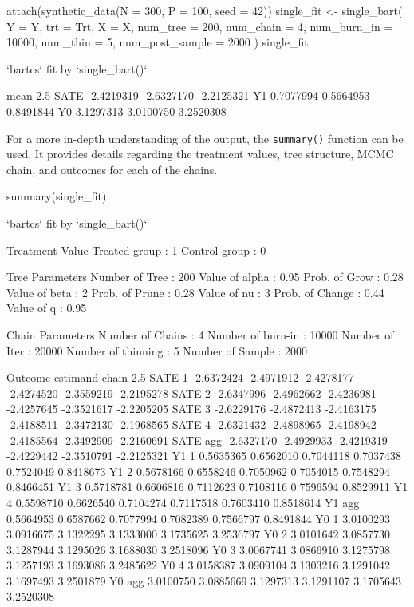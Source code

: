 \begin{example}
attach(synthetic_data(N = 300, P = 100, seed = 42))
single_fit <- single_bart(
    Y = Y, trt = Trt, X = X,
    num_tree = 200, num_chain = 4,
    num_burn_in = 10000, num_thin = 5, num_post_sample = 2000
  )
single_fit

`bartcs` fit by `single_bart()`

           mean       2.5%
SATE -2.4219319 -2.6327170 -2.2125321
Y1    0.7077994  0.5664953  0.8491844
Y0    3.1297313  3.0100750  3.2520308
\end{example}
For a more in-depth understanding of the output, the \verb|summary()| function can be used. It provides
details regarding the treatment values, tree structure, MCMC chain, and outcomes for each of the
chains.
\begin{example}
summary(single_fit)

`bartcs` fit by `single_bart()`

Treatment Value
  Treated group    :      1
  Control group    :      0

Tree Parameters
  Number of Tree   :    200		Value  of alpha    :   0.95
  Prob.  of Grow   :   0.28		Value  of beta     :      2
  Prob.  of Prune  :   0.28		Value  of nu       :      3
  Prob.  of Change :   0.44		Value  of q        :   0.95

Chain Parameters
  Number of Chains :      4		Number of burn-in  :  10000
  Number of Iter   :  20000		Number of thinning :      5
  Number of Sample :   2000

Outcome
 estimand chain       2.5%
      SATE    1 -2.6372424 -2.4971912 -2.4278177 -2.4274520 -2.3559219 -2.2195278
      SATE    2 -2.6347996 -2.4962662 -2.4236981 -2.4257645 -2.3521617 -2.2205205
      SATE    3 -2.6229176 -2.4872413 -2.4163175 -2.4188511 -2.3472130 -2.1968565
      SATE    4 -2.6321432 -2.4898965 -2.4198942 -2.4185564 -2.3492909 -2.2160691
      SATE  agg -2.6327170 -2.4929933 -2.4219319 -2.4229442 -2.3510791 -2.2125321
       Y1     1  0.5635365  0.6562010  0.7044118  0.7037438  0.7524049  0.8418673
       Y1     2  0.5678166  0.6558246  0.7050962  0.7054015  0.7548294  0.8466451
       Y1     3  0.5718781  0.6606816  0.7112623  0.7108116  0.7596594  0.8529911
       Y1     4  0.5598710  0.6626540  0.7104274  0.7117518  0.7603410  0.8518614
       Y1   agg  0.5664953  0.6587662  0.7077994  0.7082389  0.7566797  0.8491844
       Y0     1  3.0100293  3.0916675  3.1322295  3.1333000  3.1735625  3.2536797
       Y0     2  3.0101642  3.0857730  3.1287944  3.1295026  3.1688030  3.2518096
       Y0     3  3.0067741  3.0866910  3.1275798  3.1257193  3.1693086  3.2485622
       Y0     4  3.0158387  3.0909104  3.1303216  3.1291042  3.1697493  3.2501879
       Y0   agg  3.0100750  3.0885669  3.1297313  3.1291107  3.1705643  3.2520308
\end{example}

